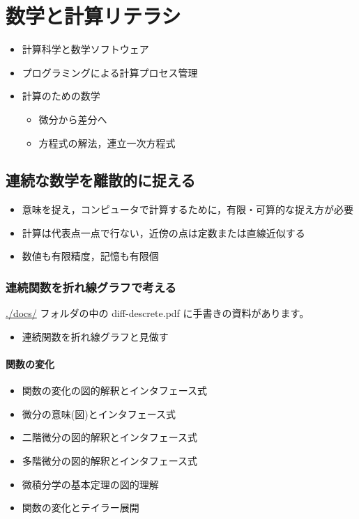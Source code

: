 \documentclass[dvipdfmx,11pat]{jarticle}
\begin{document}
\section{数学と計算リテラシ}
\label{sec:orgb3fa60b}
\begin{itemize}
\item 計算科学と数学ソフトウェア
\item プログラミングによる計算プロセス管理
\item 計算のための数学
\begin{itemize}
\item 微分から差分へ
\item 方程式の解法，連立一次方程式
\end{itemize}
\end{itemize}
\subsection{連続な数学を離散的に捉える}
\label{sec:orgc4872dc}
\begin{itemize}
\item 意味を捉え，コンピュータで計算するために，有限・可算的な捉え方が必要
\item 計算は代表点一点で行ない，近傍の点は定数または直線近似する
\item 数値も有限精度，記憶も有限個
\end{itemize}
\subsubsection{連続関数を折れ線グラフで考える}
\label{sec:orgf436177}

\url{./docs/} フォルダの中の diff-descrete.pdf に手書きの資料があります。
\begin{itemize}
\item 連続関数を折れ線グラフと見做す
\end{itemize}
\paragraph{関数の変化}
\label{sec:org96e6bf6}
\begin{itemize}
\item 関数の変化の図的解釈とインタフェース式

\item 微分の意味(図)とインタフェース式

\item 二階微分の図的解釈とインタフェース式

\item 多階微分の図的解釈とインタフェース式

\item 微積分学の基本定理の図的理解

\item 関数の変化とテイラー展開
\end{itemize}
\end{document}
